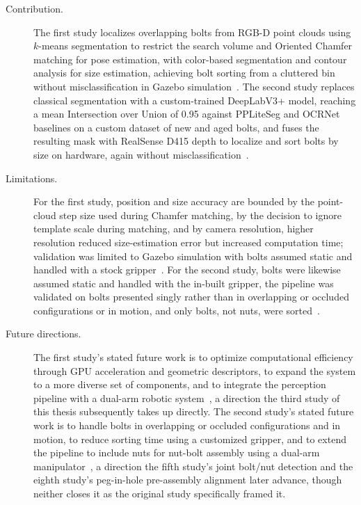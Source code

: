 \begin{description}
    \item[Contribution.] The first study localizes overlapping bolts from RGB-D point clouds using
    $k$-means segmentation to restrict the search volume and Oriented Chamfer matching for pose
    estimation, with color-based segmentation and contour analysis for size estimation, achieving
    bolt sorting from a cluttered bin without misclassification in Gazebo
    simulation~\citep{sk2024bolthandling}. The second study replaces classical segmentation with a
    custom-trained DeepLabV3+ model, reaching a mean Intersection over Union of 0.95 against
    PPLiteSeg and OCRNet baselines on a custom dataset of new and aged bolts, and fuses the resulting
    mask with RealSense D415 depth to localize and sort bolts by size on hardware, again without
    misclassification~\citep{sk2024boltsorting}.

    \item[Limitations.] For the first study, position and size accuracy are bounded by the
    point-cloud step size used during Chamfer matching, by the decision to ignore template scale
    during matching, and by camera resolution, higher resolution reduced size-estimation error but
    increased computation time; validation was limited to Gazebo simulation with bolts assumed
    static and handled with a stock gripper~\citep{sk2024bolthandling}. For the second study, bolts
    were likewise assumed static and handled with the in-built gripper, the pipeline was validated
    on bolts presented singly rather than in overlapping or occluded configurations or in motion, and
    only bolts, not nuts, were sorted~\citep{sk2024boltsorting}.

    \item[Future directions.] The first study's stated future work is to optimize computational
    efficiency through GPU acceleration and geometric descriptors, to expand the system to a more
    diverse set of components, and to integrate the perception pipeline with a dual-arm robotic
    system~\citep{sk2024bolthandling}, a direction the third study of this thesis subsequently takes
    up directly. The second study's stated future work is to handle bolts in overlapping or occluded
    configurations and in motion, to reduce sorting time using a customized gripper, and to extend
    the pipeline to include nuts for nut-bolt assembly using a dual-arm
    manipulator~\citep{sk2024boltsorting}, a direction the fifth study's joint bolt/nut detection and
    the eighth study's peg-in-hole pre-assembly alignment later advance, though neither closes it as
    the original study specifically framed it.
\end{description}

